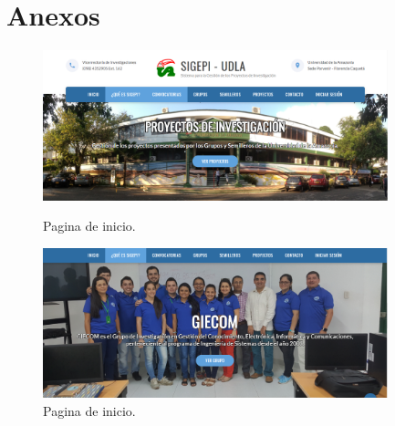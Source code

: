 \section*{Anexos}


\begin{figure}[htbp]
	\centering
	\includegraphics[width=100mm]{resources/capturas/inicio.png} 
	\caption{Pagina de inicio.} \label{anexo:pagina_inicio1}

	\includegraphics[width=100mm]{resources/capturas/inicio2.png}
	\caption{Pagina de inicio.} \label{anexo:pagina_inicio2}
\end{figure}